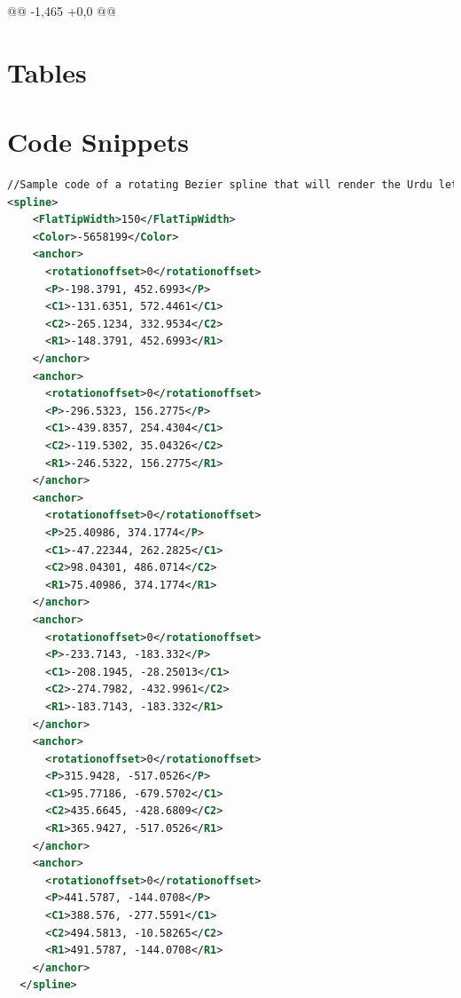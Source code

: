 @@ -1,465 +0,0 @@
\section{Tables}\label{Appendix:Tables}
\section{Code Snippets}\label{Appendix:CodeSnippets}
{
\begin{lstlisting}[language=XML]
//Sample code of a rotating Bezier spline that will render the Urdu letter Aa'en in Nastaleeq.
<spline>
    <FlatTipWidth>150</FlatTipWidth>
    <Color>-5658199</Color>
    <anchor>
      <rotationoffset>0</rotationoffset>
      <P>-198.3791, 452.6993</P>
      <C1>-131.6351, 572.4461</C1>
      <C2>-265.1234, 332.9534</C2>
      <R1>-148.3791, 452.6993</R1>
    </anchor>
    <anchor>
      <rotationoffset>0</rotationoffset>
      <P>-296.5323, 156.2775</P>
      <C1>-439.8357, 254.4304</C1>
      <C2>-119.5302, 35.04326</C2>
      <R1>-246.5322, 156.2775</R1>
    </anchor>
    <anchor>
      <rotationoffset>0</rotationoffset>
      <P>25.40986, 374.1774</P>
      <C1>-47.22344, 262.2825</C1>
      <C2>98.04301, 486.0714</C2>
      <R1>75.40986, 374.1774</R1>
    </anchor>
    <anchor>
      <rotationoffset>0</rotationoffset>
      <P>-233.7143, -183.332</P>
      <C1>-208.1945, -28.25013</C1>
      <C2>-274.7982, -432.9961</C2>
      <R1>-183.7143, -183.332</R1>
    </anchor>
    <anchor>
      <rotationoffset>0</rotationoffset>
      <P>315.9428, -517.0526</P>
      <C1>95.77186, -679.5702</C1>
      <C2>435.6645, -428.6809</C2>
      <R1>365.9427, -517.0526</R1>
    </anchor>
    <anchor>
      <rotationoffset>0</rotationoffset>
      <P>441.5787, -144.0708</P>
      <C1>388.576, -277.5591</C1>
      <C2>494.5813, -10.58265</C2>
      <R1>491.5787, -144.0708</R1>
    </anchor>
  </spline>
\end{lstlisting}
}
